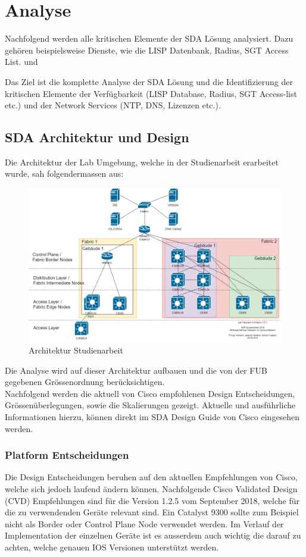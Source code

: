 \section{Analyse}
Nachfolgend werden alle kritischen Elemente der SDA Lösung analysiert. Dazu gehören beispielsweise Dienste, wie die LISP Datenbank, Radius, SGT Access List. und 

Das Ziel ist die komplette Analyse der SDA Lösung und die Identifizierung der kritischen Elemente der Verfügbarkeit (LISP Database, Radius, SGT Access-list etc.) und der Network Services (NTP, DNS, Lizenzen etc.).

\subsection{SDA Architektur und Design}
Die Architektur der Lab Umgebung, welche in der Studienarbeit erarbeitet wurde, sah folgendermassen aus:

\begin{figure}[H]
	\centering
	\includegraphics[width=1\linewidth]{img/Architecture/LabNetworkArchitecture_SA}
	\caption{Architektur Studienarbeit}
	\label{fig:Architektur Studienarbeit}
\end{figure}

Die Analyse wird auf dieser Architektur aufbauen und die von der FUB gegebenen Grössenordnung berücksichtigen. \\

Nachfolgend werden die aktuell von Cisco empfohlenen Design Entscheidungen, Grössen\-über\-legungen, sowie die Skalierungen gezeigt. Aktuelle und ausführliche Informationen hierzu, können direkt im SDA Design Guide von Cisco \cite{sda-designguide-sept2018} eingesehen werden. 

\subsubsection{Platform Entscheidungen}
Die Design Entscheidungen beruhen auf den aktuellen Empfehlungen von Cisco, welche sich jedoch laufend ändern können. Nachfolgende Cisco Validated Design (CVD) Empfehlungen sind für die Version 1.2.5 vom September 2018, welche für die zu verwendenden Geräte relevant sind. Ein Catalyst 9300 sollte zum Beispiel nicht als Border oder Control Plane Node verwendet werden. Im Verlauf der Implementation der einzelnen Geräte ist es ausserdem auch wichtig die darauf zu achten, welche genauen IOS Versionen unterstützt werden. 

